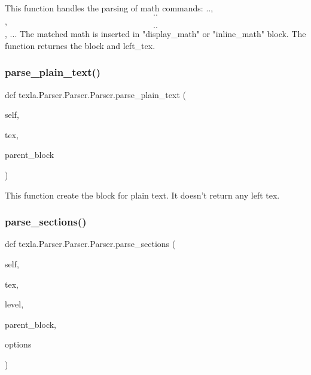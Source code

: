 \begin{DoxyVerb}This function handles the parsing of math commands:
$..$, $$..$$, \[..\], \(..\). The matched math
is inserted in "display_math" or "inline_math" block.
The function returnes the block and left_tex.
\end{DoxyVerb}
 \hypertarget{classtexla_1_1Parser_1_1Parser_1_1Parser_af5273483c94bc329e6ec18d67967ce4a}{}\label{classtexla_1_1Parser_1_1Parser_1_1Parser_af5273483c94bc329e6ec18d67967ce4a} 
\subsubsection{\texorpdfstring{parse\+\_\+plain\+\_\+text()}{parse\_plain\_text()}}
{\footnotesize\ttfamily def texla.\+Parser.\+Parser.\+Parser.\+parse\+\_\+plain\+\_\+text (\begin{DoxyParamCaption}\item[{}]{self,  }\item[{}]{tex,  }\item[{}]{parent\+\_\+block }\end{DoxyParamCaption})}

\begin{DoxyVerb}This function create the block for plain text.
It doesn't return any left tex.
\end{DoxyVerb}
 \hypertarget{classtexla_1_1Parser_1_1Parser_1_1Parser_a7f65437398ebf3111c428747fdac9489}{}\label{classtexla_1_1Parser_1_1Parser_1_1Parser_a7f65437398ebf3111c428747fdac9489} 
\subsubsection{\texorpdfstring{parse\+\_\+sections()}{parse\_sections()}}
{\footnotesize\ttfamily def texla.\+Parser.\+Parser.\+Parser.\+parse\+\_\+sections (\begin{DoxyParamCaption}\item[{}]{self,  }\item[{}]{tex,  }\item[{}]{level,  }\item[{}]{parent\+\_\+block,  }\item[{}]{options }\end{DoxyParamCaption})}

